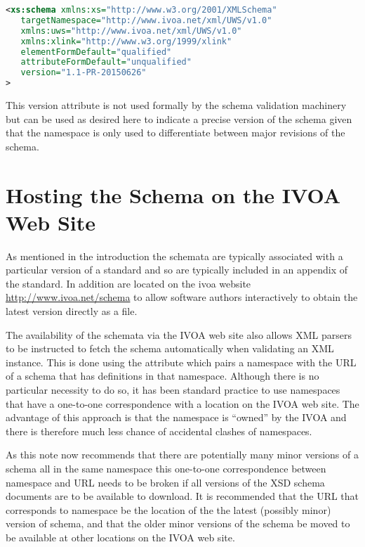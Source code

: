 \documentclass[10pt,a4paper]{ivoa}
\begin{document}
\begin{lstlisting}[language=XML]
<xs:schema xmlns:xs="http://www.w3.org/2001/XMLSchema"
   targetNamespace="http://www.ivoa.net/xml/UWS/v1.0"
   xmlns:uws="http://www.ivoa.net/xml/UWS/v1.0"
   xmlns:xlink="http://www.w3.org/1999/xlink" 
   elementFormDefault="qualified"
   attributeFormDefault="unqualified"
   version="1.1-PR-20150626"
>
\end{lstlisting}

This version attribute is not used formally by the schema validation machinery
but can be used as desired here to indicate a precise version of the schema
given that the namespace is only used to differentiate between major revisions
of the schema.



\section{Hosting the Schema on the IVOA Web Site}
As mentioned in the introduction the schemata are typically associated with a
particular version of a standard and so are typically included in an appendix of
the standard. In addition are located on the ivoa website
\url{http://www.ivoa.net/schema} to allow software authors interactively to
obtain the latest version directly as a file.

The availability of the schemata via the IVOA web site also
allows XML parsers to be instructed to fetch the schema automatically when
validating an XML instance. This is done using the 
attribute which pairs a namespace with the URL of a schema that has definitions
in that namespace. Although there is no particular necessity to do so, it has
been standard practice to use namespaces that have a one-to-one correspondence
with a location on the IVOA web site. The advantage of this approach is that the
namespace is ``owned'' by the IVOA and there is therefore much less chance of
accidental clashes of namespaces.

As this note now recommends that there are potentially many minor versions of a
schema all in the same namespace this one-to-one correspondence between
namespace and URL needs to be broken if all versions of the XSD schema documents
are to be available to download. It is recommended that the URL that
corresponds to namespace be the location of the the latest (possibly minor)
version of schema, and that the older minor versions of the schema be moved to
be available at other locations on the IVOA web site.
\end{document}
